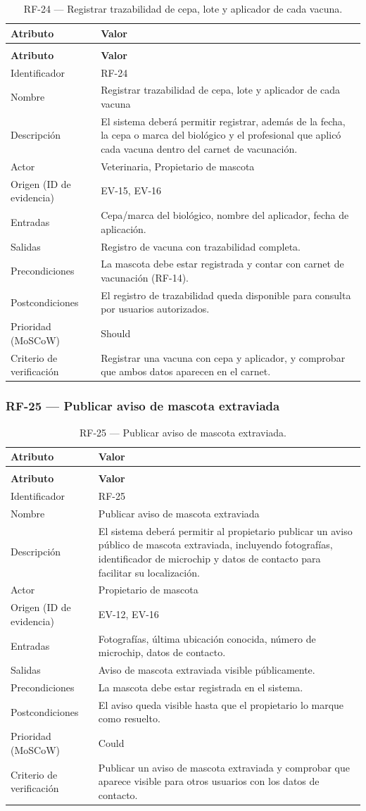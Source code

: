 \documentclass[journal,onecolumn]{IEEEtran}
\makeatletter
\newenvironment{atributos}[2]{%
	\small
	\begin{longtable}{@{}>{\raggedright\arraybackslash}p{4.2cm} >{\raggedright\arraybackslash}p{11.2cm}@{}}
		\caption{#2}\label{tab:#1}\\
		\toprule
		\textbf{Atributo} & \textbf{Valor} \\
		\midrule
		\endfirsthead
		\multicolumn{2}{@{}l}{\small\itshape (continuación)}\\
		\toprule
		\textbf{Atributo} & \textbf{Valor} \\
		\midrule
		\endhead
		\bottomrule
		\endlastfoot
	}{%
	\end{longtable}
	\normalsize
}
\makeatother
\begin{document}
	\begin{atributos}{RF-24}{RF-24 --- Registrar trazabilidad de cepa, lote y aplicador de cada vacuna.}
		Identificador & RF-24 \\
		Nombre & Registrar trazabilidad de cepa, lote y aplicador de cada vacuna \\
		Descripción & El sistema deberá permitir registrar, además de la fecha, la cepa o marca del biológico y el profesional que aplicó cada vacuna dentro del carnet de vacunación. \\
		Actor & Veterinaria, Propietario de mascota \\
		Origen (ID de evidencia) & EV-15, EV-16 \\
		Entradas & Cepa/marca del biológico, nombre del aplicador, fecha de aplicación. \\
		Salidas & Registro de vacuna con trazabilidad completa. \\
		Precondiciones & La mascota debe estar registrada y contar con carnet de vacunación (RF-14). \\
		Postcondiciones & El registro de trazabilidad queda disponible para consulta por usuarios autorizados. \\
		Prioridad (MoSCoW) & Should \\
		Criterio de verificación & Registrar una vacuna con cepa y aplicador, y comprobar que ambos datos aparecen en el carnet. \\
	\end{atributos}
	
	\subsubsection{RF-25 --- Publicar aviso de mascota extraviada}
	
	\begin{atributos}{RF-25}{RF-25 --- Publicar aviso de mascota extraviada.}
		Identificador & RF-25 \\
		Nombre & Publicar aviso de mascota extraviada \\
		Descripción & El sistema deberá permitir al propietario publicar un aviso público de mascota extraviada, incluyendo fotografías, identificador de microchip y datos de contacto para facilitar su localización. \\
		Actor & Propietario de mascota \\
		Origen (ID de evidencia) & EV-12, EV-16 \\
		Entradas & Fotografías, última ubicación conocida, número de microchip, datos de contacto. \\
		Salidas & Aviso de mascota extraviada visible públicamente. \\
		Precondiciones & La mascota debe estar registrada en el sistema. \\
		Postcondiciones & El aviso queda visible hasta que el propietario lo marque como resuelto. \\
		Prioridad (MoSCoW) & Could \\
		Criterio de verificación & Publicar un aviso de mascota extraviada y comprobar que aparece visible para otros usuarios con los datos de contacto. \\
	\end{atributos}
	
\end{document}
